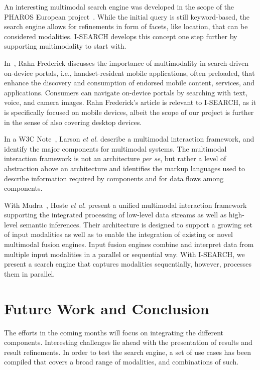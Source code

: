 \documentclass{acm_proc_article-sp}
\begin{document}
An interesting multimodal search engine was developed in the scope of the PHAROS European project~\cite{pharos2008}. While the initial query is still keyword-based, the search engine allows for refinements in form of facets, like location, that can be considered modalities.
\mbox{I-SEARCH} develops this concept one step further by supporting multimodality to start with.

In~\cite{multimodalitysun}, Rahn Frederick discusses the importance of multimodality in search-driven on-device portals, i.e., handset-resident mobile applications, often preloaded, that enhance the discovery and consumption of endorsed mobile content, services, and applications.
Consumers can navigate on-device portals by searching with text, voice, and camera images.
Rahn Frederick's article is relevant to \mbox{I-SEARCH}, as it is specifically focused on mobile devices, albeit the scope of our project is further in the sense of also covering desktop devices. 

In a W3C Note~\cite{w3cmultimodal2003}, Larson \textit{et al.} describe a multimodal interaction framework, and identify the major components for multimodal systems.
The multimodal interaction framework is not an architecture \textit{per se}, but rather a level of abstraction above an architecture and identifies the markup languages used to describe information required by components and for data flows among components.

With Mudra~\cite{mudra2011}, Hoste \textit{et al.} present a unified multimodal interaction framework supporting the integrated processing of low-level data streams as well as high-level semantic inferences.
Their architecture is designed to support a growing set of input modalities as well as to enable the integration of existing or novel multimodal fusion engines.
Input fusion engines combine and interpret data from multiple input modalities in a parallel or sequential way.
With \mbox{I-SEARCH}, we present a search engine that captures modalities sequentially, however, processes them in parallel.

\section{Future Work and Conclusion} \label{sec:futureworkconclusion}
The efforts in the coming months will focus on integrating the different components.
Interesting challenges lie ahead with the presentation of results and result refinements.
In order to test the search engine, a set of use cases has been compiled that covers a broad range of modalities, and combinations of such.
\end{document}
